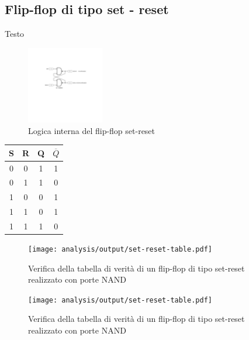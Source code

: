 \documentclass[journal]{IEEEtran}
\begin{document}
\subsection{Flip-flop di tipo set - reset}
Testo

\begin{figure}[H]%
\begin{center}
\includegraphics[width=0.30\textwidth]{sch-simulations/digital/output/flip-flop-RS.pdf}
\caption{Logica interna del flip-flop set-reset}
\label{fig:circuit_flip_flop}
\end{center}
\end{figure}
\begin{center}
\begin{tabular}{ |c|c|c|c| } 
 \hline
 S & R & Q & $\overline{Q}$ \\ \hline 
 0 & 0 & 1 & 1 \\ \hline
 0 & 1 & 1 & 0 \\ \hline
 1 & 0 & 0 & 1 \\ \hline
 1 & 1 & 0 & 1 \\ \hline
 1 & 1 & 1 & 0 \\ \hline
\end{tabular}
\end{center}

\begin{figure}[H]%
\begin{center}
\texttt{[image: analysis/output/set-reset-table.pdf]}
\caption{Verifica della tabella di verità di un flip-flop di tipo set-reset realizzato con porte NAND}
\label{fig:graph_ring_oscillator}
\end{center}
\end{figure}


\begin{figure}[H]%
\begin{center}
\texttt{[image: analysis/output/set-reset-table.pdf]}
\caption{Verifica della tabella di verità di un flip-flop di tipo set-reset realizzato con porte NAND}
\label{fig:graph_ring_oscillator}
\end{center}
\end{figure}
\end{document}
